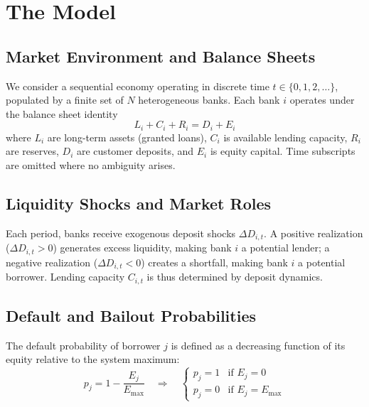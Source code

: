 \documentclass{article}
\begin{document}
\section{The Model}

\subsection{Market Environment and Balance Sheets}

We consider a sequential economy operating in discrete time $t \in \{0, 1, 2, \dots\}$,
populated by a finite set of $N$ heterogeneous banks. Each bank $i$ operates under the
balance sheet identity
\begin{equation}
    L_{i} + C_{i} + R_{i} = D_{i} + E_{i}
\end{equation}
where $L_{i}$ are long-term assets (granted loans), $C_{i}$ is available lending capacity,
$R_{i}$ are reserves, $D_{i}$ are customer deposits, and $E_{i}$ is equity capital.
Time subscripts are omitted where no ambiguity arises.

\subsection{Liquidity Shocks and Market Roles}

Each period, banks receive exogenous deposit shocks $\Delta D_{i,t}$. A positive realization
($\Delta D_{i,t} > 0$) generates excess liquidity, making bank $i$ a potential lender;
a negative realization ($\Delta D_{i,t} < 0$) creates a shortfall, making bank $i$ a
potential borrower. Lending capacity $C_{i,t}$ is thus determined by deposit dynamics.

\subsection{Default and Bailout Probabilities}

The default probability of borrower $j$ is defined as a decreasing function of its
equity relative to the system maximum:
\begin{equation}
    p_{j} = 1 - \frac{E_{j}}{E_{\max}}
    \quad \Rightarrow \quad
    \begin{cases} p_{j} = 1 & \text{if } E_{j} = 0 \\ p_{j} = 0 & \text{if } E_{j} = E_{\max} \end{cases}
\end{equation}
\end{document}
